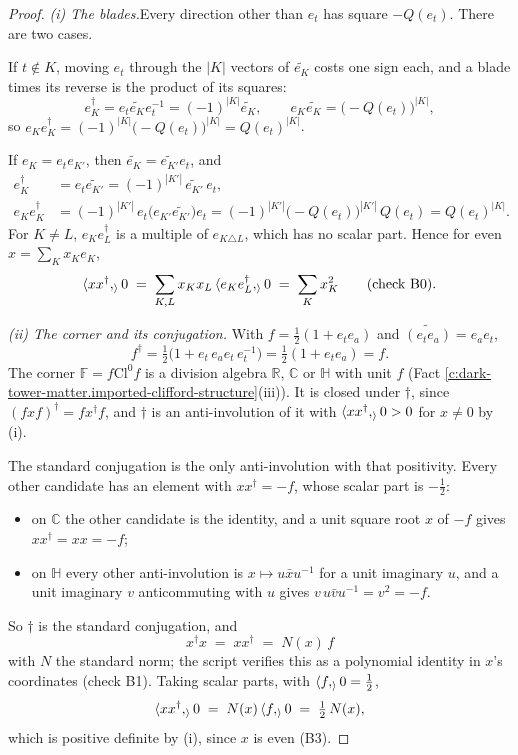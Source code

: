 \documentclass[11pt]{article}
\theoremstyle{definition}
\theoremstyle{plain}
\providecommand{\C}{}\renewcommand{\C}{\mathbb{C}}
\providecommand{\Cl}{}\renewcommand{\Cl}{\mathrm{Cl}}
\providecommand{\F}{}\renewcommand{\F}{\mathbb{F}}
\providecommand{\HH}{}\renewcommand{\HH}{\mathbb{H}}
\providecommand{\R}{}\renewcommand{\R}{\mathbb{R}}
\providecommand{\ip}{}\renewcommand{\ip}[2]{\langle #1, #2\rangle}
\providecommand{\rev}{}\renewcommand{\rev}[1]{\widetilde{#1}}
\begin{document}
\begin{proof}
\textit{(i) The blades.}\enspace Every direction other than $e_{t}$ has square $-Q(e_{t})$. There are two cases.

If $t \notin K$, moving $e_{t}$ through the $|K|$ vectors of $\rev{e_{K}}$ costs one sign each, and a blade times its reverse is the product of its squares:
\[
e_{K}^{\dagger} = e_{t}\rev{e_{K}}e_{t}^{-1} = (-1)^{|K|}\rev{e_{K}}, \qquad e_{K}\rev{e_{K}} = \bigl(-Q(e_{t})\bigr)^{|K|},
\]
so $e_{K}e_{K}^{\dagger} = (-1)^{|K|}\bigl(-Q(e_{t})\bigr)^{|K|} = Q(e_{t})^{|K|}$.

If $e_{K} = e_{t}e_{K'}$, then $\rev{e_{K}} = \rev{e_{K'}}e_{t}$, and
\begin{align*}
e_{K}^{\dagger} &= e_{t}\rev{e_{K'}} = (-1)^{|K'|}\,\rev{e_{K'}}\,e_{t}, \\
e_{K}e_{K}^{\dagger} &= (-1)^{|K'|}\,e_{t}\bigl(e_{K'}\rev{e_{K'}}\bigr)e_{t} = (-1)^{|K'|}\bigl(-Q(e_{t})\bigr)^{|K'|}\,Q(e_{t}) = Q(e_{t})^{|K|}.
\end{align*}
For $K \neq L$, $e_{K}e_{L}^{\dagger}$ is a multiple of $e_{K \triangle L}$, which has no scalar part. Hence for even $x = \sum_{K}x_{K}e_{K}$,
\[
\ip{xx^{\dagger}}_{0} \;=\; \sum_{K,L}x_{K}x_{L}\,\ip{e_{K}e_{L}^{\dagger}}_{0} \;=\; \sum_{K}x_{K}^{2} \qquad \text{(check B0)}.
\]



\emph{(ii) The corner and its conjugation.}  With $f = \tfrac{1}{2}(1 + e_{t}e_{a})$ and $\rev{(e_{t}e_{a})} = e_{a}e_{t}$,
\[
f^{\dagger} = \tfrac{1}{2}\bigl(1 + e_{t}\,e_{a}e_{t}\,e_{t}^{-1}\bigr) = \tfrac{1}{2}(1 + e_{t}e_{a}) = f.
\]
The corner $\F = f\Cl^{0}f$ is a division algebra $\R$, $\C$ or $\HH$ with unit $f$ (Fact \ref{c:dark-tower-matter.imported-clifford-structure}(iii)). It is closed under $\dagger$, since $(fxf)^{\dagger} = fx^{\dagger}f$, and $\dagger$ is an anti-involution of it with $\ip{xx^{\dagger}}_{0} > 0$ for $x \neq 0$ by (i).

The standard conjugation is the only anti-involution with that positivity. Every other candidate has an element with $xx^{\dagger} = -f$, whose scalar part is $-\tfrac{1}{2}$:
\begin{itemize}
\item on $\C$ the other candidate is the identity, and a unit square root $x$ of $-f$ gives $xx^{\dagger} = xx = -f$;
\item on $\HH$ every other anti-involution is $x \mapsto u\bar{x}u^{-1}$ for a unit imaginary $u$, and a unit imaginary $v$ anticommuting with $u$ gives $v\,u\bar{v}u^{-1} = v^{2} = -f$.
\end{itemize}
So $\dagger$ is the standard conjugation, and
\[
x^{\dagger}x \;=\; xx^{\dagger} \;=\; N(x)\,f
\]
with $N$ the standard norm; the script verifies this as a polynomial identity in $x$'s coordinates (check B1). Taking scalar parts, with $\ip{f}_{0} = \tfrac{1}{2}$,
\[
\ip{xx^{\dagger}}_{0} \;=\; N(x)\,\ip{f}_{0} \;=\; \tfrac{1}{2}\,N(x),
\]
which is positive definite by (i), since $x$ is even (B3).




\end{proof}
\end{document}
